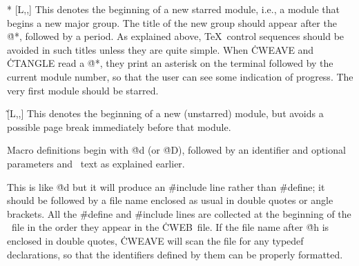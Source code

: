\@* [\overline L,\oP,\oT] This denotes the beginning of a new starred
module, i.e., a module that begins a new major group. The title of the new
group should appear after the \.{@*}, followed by a period. As explained
above, \TeX\ control sequences should be avoided in such titles unless
they are quite simple. When \.{CWEAVE} and \.{CTANGLE} read a \.{@*}, they
print an asterisk on the terminal
followed by the current module number, so that the user
can see some indication of progress. The very first module should be starred.

\@\~ [\overline L,\oP,\oT] This denotes the beginning of a new (unstarred)
module, but avoids a possible page break immediately before that module.

\@d [\oP,\oT] Macro definitions begin with \.{@d} (or \.{@D}), followed by
an identifier and optional parameters and \Cee\ text as explained earlier.

\@h [\oP,\oT] This is like \.{@d} but it will produce an \.{\#include} line
rather than \.{\#define}; it should be followed by a file name enclosed as
usual in double quotes or angle brackets. All the \.{\#define} and
\.{\#include} lines are collected at the beginning of the \Cee~file in the
order they appear in the \.{CWEB}~file. If the file name after \.{@h} is
enclosed in double quotes, \.{CWEAVE} will scan the file for any typedef
declarations, so that the identifiers defined by them can be properly
formatted.

